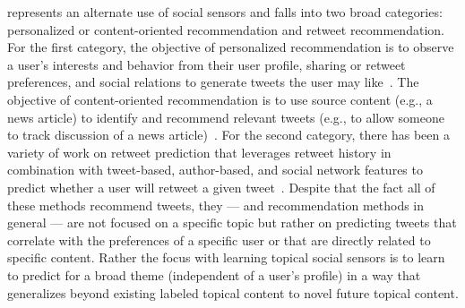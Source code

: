 %

%

% 

\vspace{2mm}
 represents an alternate use of
social sensors and falls into two broad categories: personalized or
content-oriented recommendation and retweet recommendation.  For the
first category, the objective of personalized recommendation is to
observe a user's interests and behavior from their user profile,
sharing or retweet preferences, and social relations to generate
tweets the user may like~\cite{Yan,chen}.  The objective of
content-oriented recommendation is to use source content (e.g., a news
article) to identify and recommend relevant tweets (e.g., to allow
someone to track discussion of a news article)~\cite{Krestel}.  For
the second category, there has been a variety of work on retweet
prediction that leverages retweet history in combination with
tweet-based, author-based, and social network features to predict
whether a user will retweet a given
tweet~\cite{can,xu,petrovicOsborne}.  Despite that the fact all of
these methods recommend tweets, they --- and recommendation methods in
general --- are not focused on a specific topic but rather on
predicting tweets that correlate with the preferences of a specific
user or that are directly related to specific content.  Rather the
focus with learning topical social sensors is to learn to predict for
a broad theme (independent of a user's profile) in a way that
generalizes beyond existing labeled topical content to novel future
topical content.

